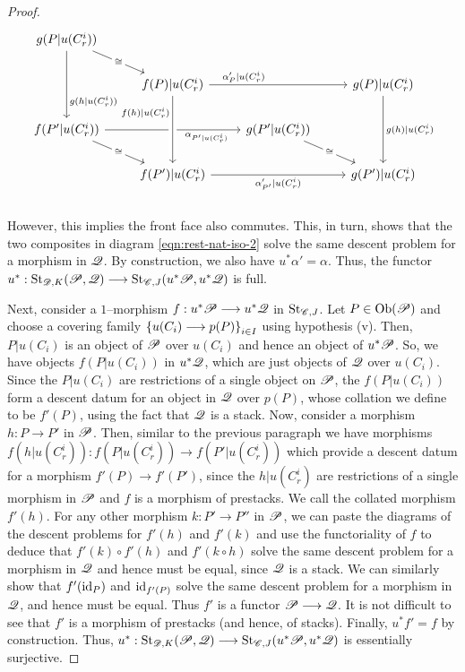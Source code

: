 \documentclass[11pt]{amsart}
\begin{document}
\begin{proof}
\[\begin{tikzcd}
g(P|u(C^i_r)) \ar[rd, "\cong" description] \ar[dd, "g(h|u(C^i_r))" near end] & \\ &
f(P)|u(C^i_r) \ar[rr, crossing over, "\alpha'_{P}|u(C^i_r)" near start] & &
g(P)|u(C^i_r) \ar[dd, "g(h)|u(C^i_r)"] \\
f(P'|u(C^i_r)) \ar[rr, "\alpha_{P'|u(C^i_r)}" below, near end] \ar[rd, "\cong" description] & &
g(P'|u(C^i_r)) \ar[rd, "\cong" description] & \\ &
f(P')|u(C^i_r)
  \ar[rr, "\alpha'_{P'}|u(C^i_r)" below]
  \ar[from=uu, crossing over, "f(h)|u(C^i_r)" left, near start] & &
g(P')|u(C^i_r) \\
\end{tikzcd}\]
However, this implies the front face also commutes. This, in turn, shows that
the two composites in diagram \ref{eqn:rest-nat-iso-2} solve the same descent problem
for a morphism in $\mathscr{Q}$. By construction, we also have $u^*\alpha' = \alpha$. Thus, the functor
$u^* : \St_{\sD, K}(\sP, \sQ) \to \St_{\sC, J}(u^*\sP, u^*\sQ)$ is full.

Next, consider a $1$--morphism $f : u^*\sP \to u^*\sQ$ in $\mathrm{St}_{\mathscr{C}, J}$. Let $P \in \Ob{\sP}$
and choose a covering family $\set{u(C_i) \to p(P)}_{i \in I}$ using hypothesis (v). Then,
$P|u(C_i)$ is an object of $\mathscr{P}$ over $u(C_i)$ and hence an object of $u^*\mathscr{P}$. So, we have
objects $f(P|u(C_i))$ in $u^*\mathscr{Q}$, which are just objects of $\mathscr{Q}$ over $u(C_i)$.
Since the $P|u(C_i)$ are restrictions of a single object on $\mathscr{P}$,
the $f(P|u(C_i))$ form a descent datum for an object in $\mathscr{Q}$ over $p(P)$,
whose collation we define to be $f'(P)$, using the fact that $\mathscr{Q}$ is a stack.
Now, consider a morphism $h : P \to P'$ in $\mathscr{P}$.
Then, similar to the previous paragraph we have morphisms
$f(h|u(C^i_r)) : f(P|u(C^i_r)) \to f(P'|u(C^i_r))$ which provide a descent datum for a morphism
$f'(P) \to f'(P')$, since the $h|u(C^i_r)$ are restrictions of a single morphism in $\mathscr{P}$
and $f$ is a morphism of prestacks. We call the collated morphism $f'(h)$. For any other morphism
$k : P' \to P''$ in $\mathscr{P}$, we can paste the diagrams of the descent problems for
$f'(h)$ and $f'(k)$ and use the functoriality of $f$ to deduce that $f'(k) \circ f'(h)$
and $f'(k \circ h)$ solve the same descent problem for a morphism in $\mathscr{Q}$ and hence must be equal,
since $\mathscr{Q}$ is a stack. We can similarly show that $f'(\mathrm{id}_{P})$ and $\mathrm{id}_{f'(P)}$ solve the same
descent problem for a morphism in $\mathscr{Q}$, and hence must be equal. Thus $f'$ is a functor
$\sP \to \sQ$. It is not difficult to see that $f'$ is a morphism of prestacks
(and hence, of stacks). Finally, $u^*f' = f$ by construction. Thus,
$u^* : \St_{\sD, K}(\sP, \sQ) \to \St_{\sC, J}(u^*\sP, u^*\sQ)$ is essentially surjective.


\end{proof}
\end{document}
